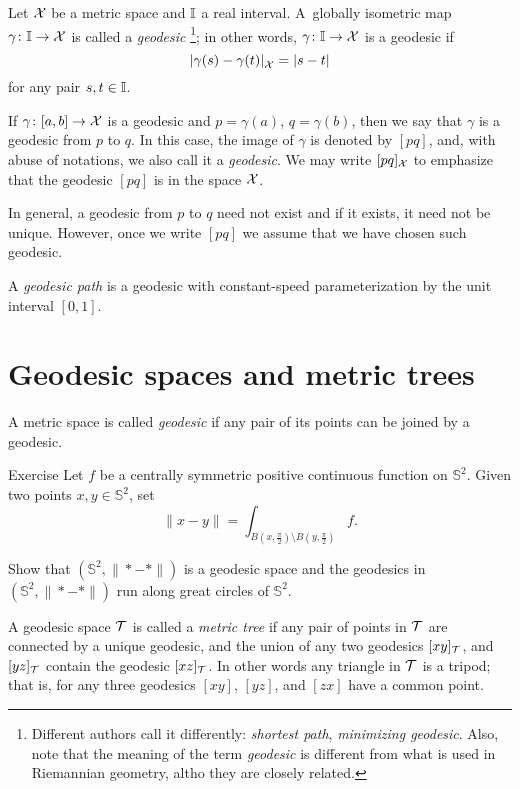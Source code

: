 Let $\mathcal{X}$ be a metric space 
and $\II$\index{$\II$} a real interval. 
A~globally isometric map $\gamma\colon\mathbb{I}\to \mathcal{X}$ is called a \emph{geodesic}%
\footnote{Different authors call it differently: {}\emph{shortest path}, {}\emph{minimizing geodesic}.
Also, note that the meaning of the term \emph{geodesic} is different from what is used in Riemannian geometry, altho they are closely related.}; 
in other words, $\gamma\colon\mathbb{I}\to \mathcal{X}$ is a geodesic if 
\[\dist{\gamma(s)}{\gamma(t)}{\spc{X}}=|s-t|\]
for any pair $s,t\in \mathbb{I}$.

If $\gamma\colon[a,b]\to \mathcal{X}$ is a geodesic and $p=\gamma(a)$, $q=\gamma(b)$, then we say that $\gamma$ is a geodesic from $p$ to $q$.
In this case, the image of $\gamma$ is denoted by $[p q]$\index{$[{*}{*}]$}, and, with abuse of notations, we also call it a \emph{geodesic}.
We may write $[p q]_{\mathcal{X}}$ 
to emphasize that the geodesic $[p q]$ is in the space  ${\mathcal{X}}$.

In general, a geodesic from $p$ to $q$ need not exist and if it exists, it need not  be unique.  
However, once we write $[p q]$ we assume that we have chosen such geodesic.

A \emph{geodesic path} is a geodesic with constant-speed parameterization by the unit interval $[0,1]$.

\section{Geodesic spaces and metric trees}

A metric space is called \emph{geodesic} if any pair of its points can be joined by a geodesic.

\begin{thm}{Exercise}\label{ex:pogorelov}
Let $f$ be a centrally symmetric positive continuous function on $\mathbb{S}^2$.
Given two points $x,y\in \mathbb{S}^2$,
set 
\[\|x-y\|=\int_{B(x,\frac \pi2)\setminus B(y,\frac\pi2)}f.\]

Show that $(\mathbb{S}^2,\|{*}-{*}\|)$ is a geodesic space
and the geodesics in $(\mathbb{S}^2,\|{*}-{*}\|)$ run along great circles of $\mathbb{S}^2$.
\end{thm}

A geodesic space $\mathcal{T}$ is called a \emph{metric tree} if any pair of points in $\mathcal{T}$ are connected by a unique geodesic,
and the union of any two geodesics $[xy]_{\mathcal{T}}$, and $[yz]_{\mathcal{T}}$ contain the geodesic $[xz]_{\mathcal{T}}$.
In other words any triangle in $\mathcal{T}$ is a tripod;
that is, for any three geodesics $[xy]$, $[yz]$, and $[zx]$ have a common point.


